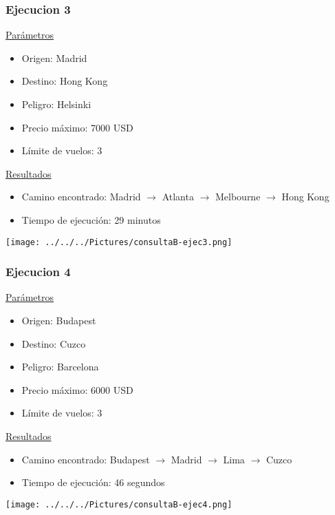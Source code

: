 \documentclass[a4paper,11pt]{article}
\begin{document}
\subsubsection*{Ejecucion 3}
\noindent
\underline{Parámetros}
\begin{itemize}
\item Origen: Madrid
\item Destino: Hong Kong
\item Peligro: Helsinki
\item Precio máximo: 7000 USD
\item Límite de vuelos: 3
\end{itemize}
\underline{Resultados}
\begin{itemize}
\item Camino encontrado: Madrid $\rightarrow$ Atlanta $\rightarrow$ Melbourne $\rightarrow$ Hong Kong
\item Tiempo de ejecución: 29 minutos
\end{itemize}
\begin{center}
\texttt{[image: ../../../Pictures/consultaB-ejec3.png]}
\end{center}

\subsubsection*{Ejecucion 4}
\noindent
\underline{Parámetros}
\begin{itemize}
\item Origen: Budapest
\item Destino: Cuzco
\item Peligro: Barcelona
\item Precio máximo: 6000 USD
\item Límite de vuelos: 3
\end{itemize}
\underline{Resultados}
\begin{itemize}
\item Camino encontrado: Budapest $\rightarrow$ Madrid $\rightarrow$ Lima $\rightarrow$ Cuzco
\item Tiempo de ejecución: 46 segundos
\end{itemize}
\begin{center}
\texttt{[image: ../../../Pictures/consultaB-ejec4.png]}
\end{center}
\end{document}

